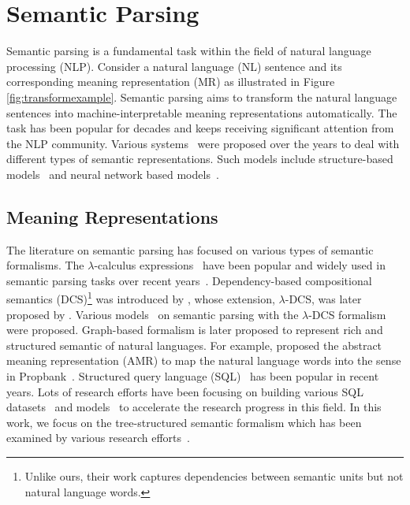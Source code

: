 \section{Semantic Parsing}
Semantic parsing is a fundamental task within the field of natural language processing (NLP).
Consider a natural language (NL) sentence and its corresponding meaning representation (MR) as illustrated in Figure \ref{fig:transformexample}.
Semantic parsing aims to transform the natural language sentences into machine-interpretable meaning representations automatically. 
The task has been popular for decades and keeps receiving significant attention from the NLP community. 
Various systems~\cite{zelle1996learning,kate2005learning,zettlemoyer2005learning,liang11learning} were proposed over the years to deal with different types of semantic representations.
Such models include structure-based models~\cite{wong2006learning,lu2008generative,kwiatkowski2010inducing,jones2012semantic}  and neural network based models~\cite{dong2016language,cheng2017learning}. 

\subsection{Meaning Representations}
The literature on semantic parsing has focused on various types of semantic formalisms. 
The $\lambda$-calculus expressions~\cite{zettlemoyer2005learning} have been popular and widely used in semantic parsing tasks over recent years~\cite{dong2016language,gardner2017open,reddy2016transforming,reddy2017universal,susanto2017neural,cheng2017learning}. 
Dependency-based compositional semantics (DCS)\footnote{Unlike ours, their work captures dependencies between  semantic units but not natural language words.} was introduced by \citet{liang11learning}, whose extension, $\lambda$-DCS, was later proposed by \citet{liang2013lambda}. 
Various models~\cite{berant2013semantic,wang2015building,jia-liang:2016:P16-1}  on semantic parsing with the $\lambda$-DCS formalism were proposed. 
Graph-based formalism is later proposed to represent rich and structured semantic of natural languages.
For example, \citet{banarescu2013abstract} proposed the abstract meaning representation (AMR) to map the natural language words into the sense in Propbank~\cite{kingsbury2002treebank}.
Structured query language (SQL)~\cite{P18-1033} has been popular in recent years. 
Lots of research efforts have been focusing on building various SQL datasets~\cite{yu2018spider,zhong2017seq2sql} and models~\cite{lin2019grammar} to accelerate the research progress in this field. 
In this work, we focus on the tree-structured semantic formalism which has been examined by various research efforts~\cite{wong2006learning,kate2006using,lu2008generative,kwiatkowski2010inducing,jones2012semantic,lu2014semantic,yan2018learn}.

